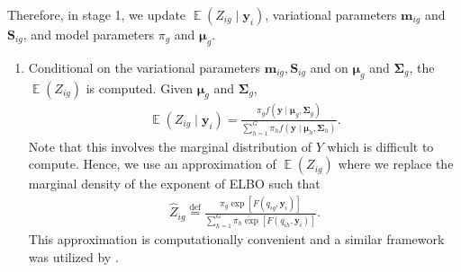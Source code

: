\documentclass[12pt]{article}
\newcommand{\bmm}{\mathbf{m}}
\newcommand{\by}{\mathbf{y}}
\newcommand{\bmu}{\boldsymbol{\mu}}
\newcommand{\bSigma}{\boldsymbol{\Sigma}}
\DeclareMathOperator{\Ev}{\mathbb{E}}
\begin{document}
\noindent Therefore, in stage 1, we update $\Ev(Z_{ig}\mid \by_i)$, variational parameters $\bmm_{ig}$  and $\mathbf{S}_{ig}$, and model parameters $\pi_g$ and $\bmu_g$.
\begin{enumerate}
\item Conditional on the variational parameters $\bmm_{ig},\mathbf{S}_{ig}$ and on $\bmu_g$ and $\bSigma_g$, the  $\Ev(Z_{ig})$ is computed. Given $\bmu_g$ and $\bSigma_g$, 
\begin{align*}
\Ev(Z_{ig}\mid \by_i)=\frac{\pi_g f(\by\mid \bmu_g,\bSigma_g)}{\sum_{h=1}^G\pi_h f(\by\mid \bmu_h,\bSigma_h)}.
\end{align*}
Note that this involves the marginal distribution of $Y$ which is difficult to compute. Hence, we use an approximation of $\Ev(Z_{ig})$ where we replace the marginal density of the exponent of ELBO such that 
\begin{align*}
\widehat{Z}_{ig}\stackrel{\text{def}}{=}\frac{\pi_g \exp\left[F\left(q_{ig},\by_i\right) \right]}{\sum_{h=1}^G\pi_h \exp\left[F\left(q_{ih},\by_i\right) \right]}.
\end{align*}
This approximation is computationally convenient and a similar framework was utilized by \cite{tang2015,gollini2014}. 


\end{enumerate}
\end{document}
